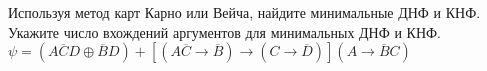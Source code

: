 \question Используя метод карт Карно или Вейча, найдите минимальные ДНФ и КНФ. Укажите число вхождений аргументов для минимальных ДНФ и КНФ.
$\psi = (A\overline{C}D \oplus \overline{B}D) + [(A\overline{C} \rightarrow \overline{B}) \rightarrow (C \rightarrow \overline{D})](A \rightarrow \overline{B}C)$